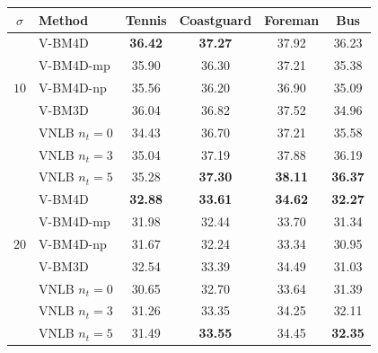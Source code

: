 \documentclass{llncs}
\newcommand{\best}[1]{\textbf{#1}}
\begin{document}
\begin{table}[htp!]
	\begin{center}
	\renewcommand{\tabcolsep}{3mm}
	\renewcommand{\arraystretch}{1.0}
	\begin{tabular}{ c | l |c c c c}
		\hline
		\rule{0pt}{12pt}$\sigma$ & Method                  & Tennis       & Coastguard   & Foreman      & Bus          \\\hline
		\multirow{5}{*}{$10$} & V-BM4D \cite{Maggioni2012} & \best{36.42} & \best{37.27} &       37.92  &       36.23  \\
		                      & V-BM4D-mp                  &       35.90  &       36.30  &       37.21  &       35.38  \\
		                      & V-BM4D-np                  &       35.56  &       36.20  &       36.90  &       35.09  \\
		                      & V-BM3D                     &       36.04  &       36.82  &       37.52  &       34.96  \\
		                      & VNLB $n_t = 0$             &       34.43  &       36.70  &       37.21  &       35.58  \\
		                      & VNLB $n_t = 3$             &       35.04  &       37.19  &       37.88  &       36.19  \\
									 & VNLB $n_t = 5$             &       35.28  & \best{37.30} & \best{38.11} & \best{36.37} \\\hline
%									 
		\multirow{5}{*}{$20$} & V-BM4D \cite{Maggioni2012} & \best{32.88} & \best{33.61} & \best{34.62} & \best{32.27} \\
		                      & V-BM4D-mp                  &       31.98  &       32.44  &       33.70  &       31.34  \\
		                      & V-BM4D-np                  &       31.67  &       32.24  &       33.34  &       30.95  \\
		                      & V-BM3D                     &       32.54  &       33.39  &       34.49  &       31.03  \\
		                      & VNLB $n_t = 0$             &       30.65  &       32.70  &       33.64  &       31.39  \\
									 & VNLB $n_t = 3$             &       31.26  &       33.35  &       34.25  &       32.11  \\
									 & VNLB $n_t = 5$             &       31.49  & \best{33.55} &       34.45  & \best{32.35} \\\hline
%									 

\end{tabular}
\end{center}
\end{table}
\end{document}
